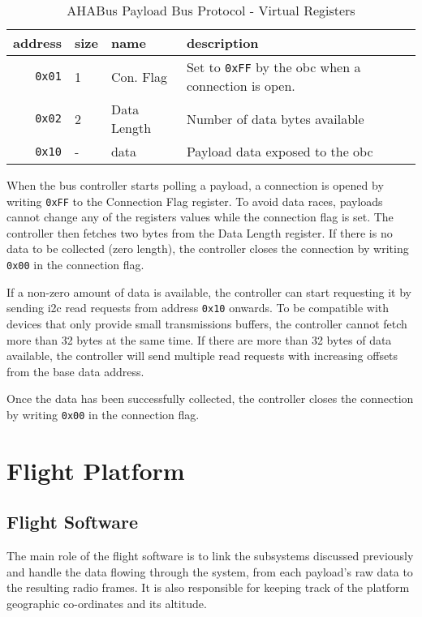 \begin{table}[h]
\begin{center}
\begin{tabular}{r||l l l}

address & size & name & description \\ \hline
\texttt{0x01} & 1 & Con. Flag & Set to \texttt{0xFF} by the \acrshort{obc} when  a connection is open. \\
\texttt{0x02} & 2 & Data Length & Number of data bytes available \\
\texttt{0x10} & - & data & Payload data exposed to the \acrshort{obc}

\end{tabular}
\end{center}
\caption {AHABus Payload Bus Protocol - Virtual Registers}
\label{tab:bus-protocol-registers}
\end{table}

When the bus controller starts polling a payload, a connection is opened by
writing \texttt{0xFF} to the Connection Flag register. To avoid data races,
payloads cannot change any of the registers values while the connection flag
is set. The controller then fetches two bytes from the Data Length register. If
there is no data to be collected (zero length), the controller closes the
connection by writing \texttt{0x00} in the connection flag.

If a non-zero amount of data is available, the controller can start requesting
it by sending \acrshort{i2c} read requests from address \texttt{0x10} onwards.
To be compatible with devices that only provide small transmissions buffers,
the controller cannot fetch more than 32 bytes at the same time. If there are
more than 32 bytes of data available, the controller will send multiple read
requests with increasing offsets from the base data address.

Once the data has been successfully collected, the controller closes the
connection by writing \texttt{0x00} in the connection flag.

\section{Flight Platform}
\label{sec:flight-software}

\subsection{Flight Software}

The main role of the flight software is to link the subsystems discussed
previously and handle the data flowing through the system, from each payload's
raw data to the resulting radio frames. It is also responsible for keeping track
of the platform geographic co-ordinates and its altitude.

